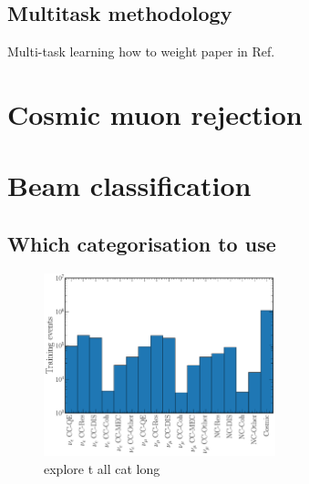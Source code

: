 \subsection{Multitask methodology} %
\label{sec:cvn_baseline_multi} %

Multi-task learning how to weight paper in Ref.~\cite{kendall2018}

\section{Cosmic muon rejection} %
\label{sec:cvn_cosmic} %

\section{Beam classification} %
\label{sec:cvn_beam} %

\subsection{Which categorisation to use} %
\label{sec:cvn_beam_cat} %

\begin{figure} %
    \includegraphics[width=0.6\textwidth]{diagrams/6-cvn/chipsnet/explore_t_all_cat.pdf}
    \caption[explore t all cat short]
    {explore t all cat long}
    \label{fig:explore_t_all_cat}
\end{figure}

